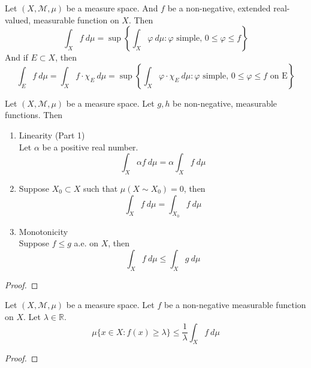 \begin{definition}
	Let $(X,\mathcal{M},\mu)$ be a measure space.
	And $f$ be a non-negative, extended real-valued, measurable function on $X$.
	Then
	\begin{equation}
		\int_X f \ d\mu = \sup \left\{ \int_X \varphi \ d\mu : \varphi \text{ simple, } 0 \le \varphi \le f \right\}
	\end{equation}
	And if $E \subset X$, then
	\begin{equation}
		\int_E f \ d\mu = \int_X f \cdot \chi_E \ d\mu = \sup \left\{ \int_X \varphi \cdot \chi_E \ d\mu : \varphi \text{ simple, } 0 \le \varphi \le f \text{ on E} \right\}
	\end{equation}
\end{definition}
\begin{theorem}
	Let $(X,\mathcal{M},\mu)$ be a measure space.
	Let $g,h$ be non-negative, measurable functions.
	Then
	\begin{enumerate}
		\item Linearity (Part 1)\\
			Let $\alpha$ be a positive real number.
			\begin{equation}
				 \int_X \alpha f \ d\mu = \alpha \int_X f \ d\mu
			\end{equation}
		\item Suppose $X_0 \subset X$ such that $\mu(X \sim X_0) = 0$, then
			\begin{equation}
				\int_X f \ d\mu = \int_{X_0} f \ d\mu
			\end{equation}
		\item Monotonicity \\
			Suppose $f \le g$ a.e. on $X$, then
			\begin{equation}
				\int_X f \ d\mu \le \int_X g \ d\mu
			\end{equation}
	\end{enumerate}
\end{theorem}
\begin{proof}
\end{proof}

\begin{theorem}
	Let $(X,\mathcal{M},\mu)$ be a measure space.
	Let $f$ be a non-negative measurable function on $X$.
	Let $\lambda \in \mathbb{R}$.
	$$\mu \{ x \in X : f(x) \ge \lambda \} \le \frac{1}{\lambda} \int_X f \ d\mu $$
\end{theorem}
\begin{proof}
\end{proof}

